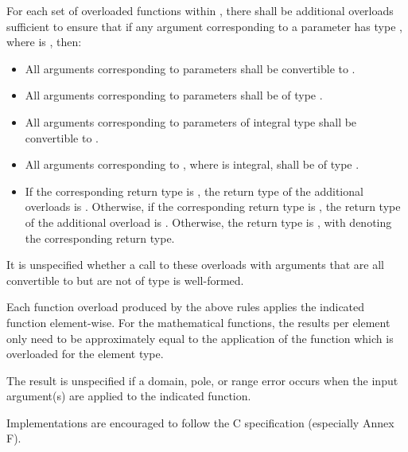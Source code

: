 \pnum
For each set of overloaded functions within , there shall be additional overloads
sufficient to ensure that if any argument corresponding to a  parameter has type
, where  is , then:
\begin{itemize}
  \item All arguments corresponding to  parameters shall be convertible to
    .
  \item All arguments corresponding to  parameters shall be of type
    .
  \item All arguments corresponding to parameters of integral type  shall be convertible to
    .
  \item All arguments corresponding to , where  is integral, shall be of type
    .
  \item If the corresponding return type is , the return type of the additional
    overloads is . Otherwise, if the corresponding return type is
    , the return type of the additional overload is . Otherwise, the return type is ,
    with  denoting the corresponding return type.
\end{itemize}
It is unspecified whether a call to these overloads with arguments that are all convertible to
 but are not of type  is well-formed.

\pnum
Each function overload produced by the above rules applies the indicated  function
element-wise. For the mathematical functions, the results per element only need to be approximately
equal to the application of the function which is overloaded for the element type.

\pnum
The result is unspecified if a domain, pole, or range error occurs when the input argument(s) are
applied to the indicated  function.
\begin{note}Implementations are encouraged to follow the C specification (especially Annex
F).\end{note}

\pnum
{}

